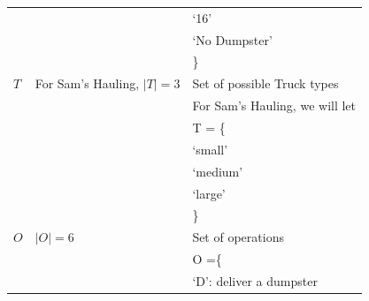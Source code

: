 \documentclass{article}
\begin{document}
\begin{tabular}{ l | l | l }
                               & $                                                           $  &   `16'                                                        \\
                               & $                                                           $  &   `No Dumpster'                                               \\
                               & $                                                           $  & \}                                                            \\
  $T$                          &   For Sam's Hauling, $ |T| = 3$                                & Set of possible Truck types                                   \\
                               & $                                                           $  & For Sam's Hauling, we will let                                \\
                               & $                                                           $  & T = \{                                                        \\
                               & $                                                           $  &  `small'                                                      \\
                               & $                                                           $  &  `medium'                                                     \\
                               & $                                                           $  &  `large'                                                      \\
                               & $                                                           $  & \}                                                            \\
  $O$                          & $  |O| = 6                                                  $  & Set of operations                                             \\
                               & $                                                           $  & O =\{                                                         \\
                               & $                                                           $  &  `D': deliver a dumpster                                      \\

\end{tabular}
\end{document}
